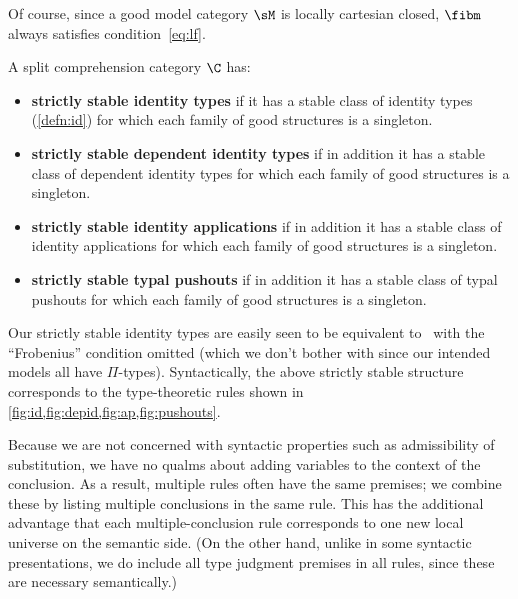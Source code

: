 Of course, since a good model category $\sM$ is locally cartesian closed, $\fibm$ always satisfies condition~\eqref{eq:lf}.

\begin{defn}
  A split comprehension category $\C$ has:
  \begin{itemize}
  \item \textbf{strictly stable identity types} if it has a stable class of identity types (\cref{defn:id}) for which each family of good structures is a singleton.
  \item \textbf{strictly stable dependent identity types} if in addition it has a stable class of dependent identity types for which each family of good structures is a singleton.
  \item \textbf{strictly stable identity applications} if in addition it has a stable class of identity applications for which each family of good structures is a singleton.
  \item \textbf{strictly stable typal pushouts} if in addition it has a stable class of typal pushouts for which each family of good structures is a singleton.
\end{itemize}
\end{defn}

Our strictly stable identity types are easily seen to be equivalent to~\cite[Definition 3.4.3.1]{lw:localuniv} with the ``Frobenius'' condition omitted (which we don't bother with since our intended models all have $\Pi$-types).
Syntactically, the above strictly stable structure corresponds to the type-theoretic rules shown in \cref{fig:id,fig:depid,fig:ap,fig:pushouts}.

\begin{rmk}\label{rmk:rule-style}
  Because we are not concerned with syntactic properties such as admissibility of substitution, we have no qualms about adding variables to the context of the conclusion.
  As a result, multiple rules often have the same premises; we combine these by listing multiple conclusions in the same rule.
  This has the additional advantage that each multiple-conclusion rule corresponds to one new local universe on the semantic side.
  (On the other hand, unlike in some syntactic presentations, we do include all type judgment premises in all rules, since these are necessary semantically.)
\end{rmk}

